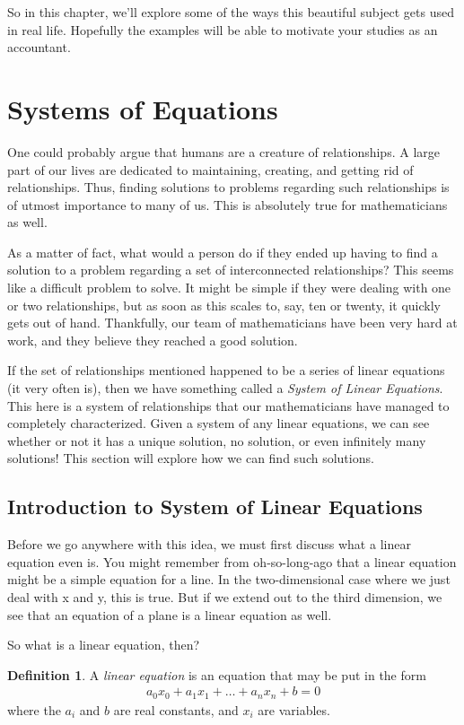 \documentclass{scrbook}
\theoremstyle{definition}
\newtheorem{definition}{Definition}[section]
\begin{document}
So in this chapter, we'll explore some of the ways this beautiful subject gets used in real life. Hopefully the examples will be able to motivate your studies as an accountant.

\section{Systems of Equations}

One could probably argue that humans are a creature of relationships. A large part of our lives are dedicated to maintaining, creating, and getting rid of relationships. Thus, finding solutions to problems regarding such relationships is of utmost importance to many of us. This is absolutely true for mathematicians as well.

As a matter of fact, what would a person do if they ended up having to find a solution to a problem regarding a set of interconnected relationships? This seems like a difficult problem to solve. It might be simple if they were dealing with one or two relationships, but as soon as this scales to, say, ten or twenty, it quickly gets out of hand. Thankfully, our team of mathematicians have been very hard at work, and they believe they reached a good solution. 

If the set of relationships mentioned happened to be a series of linear equations (it very often is), then we have something called a \textit{System of Linear Equations}. This here is a system of relationships that our mathematicians have managed to completely characterized. Given a system of any linear equations, we can see whether or not it has a unique solution, no solution, or even infinitely many solutions! This section will explore how we can find such solutions.

\subsection{Introduction to System of Linear Equations}

Before we go anywhere with this idea, we must first discuss what a linear equation even is. You might remember from oh-so-long-ago that a linear equation might be a simple equation for a line. In the two-dimensional case where we just deal with x and y, this is true. But if we extend out to the third dimension, we see that an equation of a plane is a linear equation as well.

So what is a linear equation, then?

\begin{definition}
  A \textit{linear equation} is an equation that may be put in the form 
  \begin{align*}
    a_0x_0 + a_1x_1 + \dots + a_nx_n + b = 0
  \end{align*}
  where the $a_i$ and $b$ are real constants, and $x_i$ are variables.
\end{definition}
\end{document}
